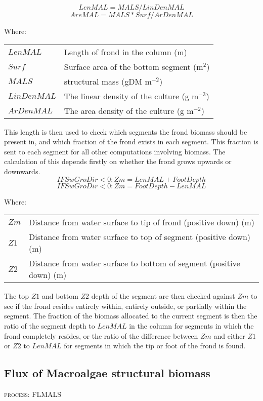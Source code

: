 \documentclass{deltares_manual}
\begin{document}
\[LenMAL = MALS/ LinDenMAL\] 
\[AreMAL = MALS * Surf / ArDenMAL\] 

Where:\\
\begin{tabular}{ll}
$LenMAL$ & Length of frond in the column (m)\\
$Surf$ & Surface area of the bottom segment (m$^{2}$)\\
$MALS$ & structural mass (gDM m$^{-2}$)\\
$LinDenMAL$ & The linear density of the culture (g m$^{-3}$)\\
$ArDenMAL$ & The area density of the culture (g m$^{-2}$)\\
\end{tabular}

This length is then used to check which segments the frond biomass should be present in, and which fraction of the frond exists in each segment. This fraction is sent to each segment for all other computations involving biomass. The calculation of this depends firstly on whether the frond grows upwards or downwards.
\[IF SwGroDir < 0: Zm = LenMAL + FootDepth\]
\[IF SwGroDir < 0: Zm = FootDepth - LenMAL\]

Where:\\
\begin{tabular}{ll}
$Zm$ & Distance from water surface to tip of frond (positive down) (m)\\
$Z1$ & Distance from water surface to top of segment (positive down) (m)\\
$Z2$ & Distance from water surface to bottom of segment (positive down) (m)\\
\end{tabular}

The top $Z1$ and bottom $Z2$ depth of the segment are then checked against $Zm$ to see if the frond resides entirely within, entirely outside, or partially within the segment. The fraction of the biomass allocated to the current segment is then the ratio of the segment depth to $LenMAL$ in the column for segments in which the frond completely resides, or the ratio of the difference between $Zm$ and either $Z1$ or $Z2$ to $LenMAL$ for segments in which the tip or foot of the frond is found.

\subsection{Flux of Macroalgae structural biomass}
\begin{flushright}
\textsc{process: FLMALS}
\end{flushright}
\end{document}
